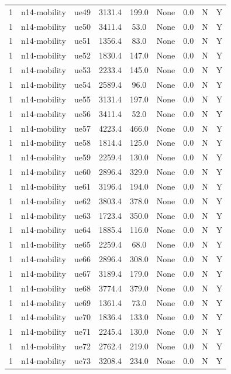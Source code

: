 \begin{table}[ht]
\begin{tabular}{|c|c|c|c|c|c|c|c|c|}
1 & n14-mobility & ue49 & 3131.4 & 199.0 & None & 0.0 & N & Y \\
1 & n14-mobility & ue50 & 3411.4 & 53.0 & None & 0.0 & N & Y \\
1 & n14-mobility & ue51 & 1356.4 & 83.0 & None & 0.0 & N & Y \\
1 & n14-mobility & ue52 & 1830.4 & 147.0 & None & 0.0 & N & Y \\
1 & n14-mobility & ue53 & 2233.4 & 145.0 & None & 0.0 & N & Y \\
1 & n14-mobility & ue54 & 2589.4 & 96.0 & None & 0.0 & N & Y \\
1 & n14-mobility & ue55 & 3131.4 & 197.0 & None & 0.0 & N & Y \\
1 & n14-mobility & ue56 & 3411.4 & 52.0 & None & 0.0 & N & Y \\
1 & n14-mobility & ue57 & 4223.4 & 466.0 & None & 0.0 & N & Y \\
1 & n14-mobility & ue58 & 1814.4 & 125.0 & None & 0.0 & N & Y \\
1 & n14-mobility & ue59 & 2259.4 & 130.0 & None & 0.0 & N & Y \\
1 & n14-mobility & ue60 & 2896.4 & 329.0 & None & 0.0 & N & Y \\
1 & n14-mobility & ue61 & 3196.4 & 194.0 & None & 0.0 & N & Y \\
1 & n14-mobility & ue62 & 3803.4 & 378.0 & None & 0.0 & N & Y \\
1 & n14-mobility & ue63 & 1723.4 & 350.0 & None & 0.0 & N & Y \\
1 & n14-mobility & ue64 & 1885.4 & 116.0 & None & 0.0 & N & Y \\
1 & n14-mobility & ue65 & 2259.4 & 68.0 & None & 0.0 & N & Y \\
1 & n14-mobility & ue66 & 2896.4 & 308.0 & None & 0.0 & N & Y \\
1 & n14-mobility & ue67 & 3189.4 & 179.0 & None & 0.0 & N & Y \\
1 & n14-mobility & ue68 & 3774.4 & 379.0 & None & 0.0 & N & Y \\
1 & n14-mobility & ue69 & 1361.4 & 73.0 & None & 0.0 & N & Y \\
1 & n14-mobility & ue70 & 1836.4 & 133.0 & None & 0.0 & N & Y \\
1 & n14-mobility & ue71 & 2245.4 & 130.0 & None & 0.0 & N & Y \\
1 & n14-mobility & ue72 & 2762.4 & 219.0 & None & 0.0 & N & Y \\
1 & n14-mobility & ue73 & 3208.4 & 234.0 & None & 0.0 & N & Y \\

\end{tabular}
\end{table}
